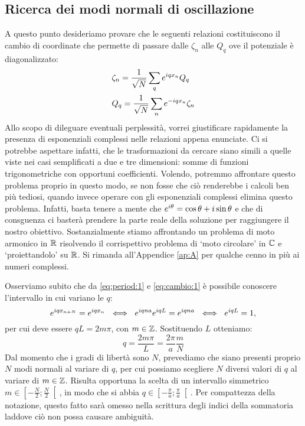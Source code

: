     \subsection{Ricerca dei modi normali di oscillazione}
        A questo punto desideriamo provare che le seguenti relazioni costituiscono il cambio di coordinate che permette di passare dalle $\zeta_n$ alle $Q_q$ ove il potenziale \`e diagonalizzato:
        \begin{align}
            &\zeta_n=\frac{1}{\sqrt{N}}\sum_q e^{iqx_n}Q_q \label{eq:cambio:1}\\
            &Q_q=\frac{1}{\sqrt{N}}\sum_n e^{-iqx_n}\zeta_n \label{eq:cambio:2}
        \end{align}
        Allo scopo di dileguare eventuali perplessit\`a, vorrei giustificare rapidamente la presenza di esponenziali complessi nelle relazioni appena enunciate. Ci si potrebbe aspettare infatti, che le trasformazioni da cercare siano simili a quelle viste nei casi semplificati a due e tre dimensioni: somme di funzioni trigonometriche con opportuni coefficienti. Volendo, potremmo affrontare questo problema proprio in questo modo, se non fosse che ci\`o renderebbe i calcoli ben pi\`u tediosi, quando invece operare con gli esponenziali complessi elimina questo problema. Infatti, basta tenere a mente che $e^{i\theta}=\cos\theta+i\sin\theta$ e che di consguenza ci baster\`a prendere la parte reale della soluzione per raggiungere il nostro obiettivo. Sostanzialmente stiamo affrontando un problema di moto armonico in $\mathbb{R}$ risolvendo il corrispettivo problema di `moto circolare' in $\mathbb{C}$ e `proiettandolo' su $\mathbb{R}$. Si rimanda all'Appendice \ref{ap:A} per qualche cenno in pi\`u ai numeri complessi.
        \par Osserviamo subito che da \eqref{eq:period:1} e \eqref{eq:cambio:1} \`e possibile conoscere l'intervallo in cui variano le $q$:
            $$\myexp{iqx_{n+N}}=\myexp{iqx_n}\ \iff\ \myexp{iqna}\myexp{iqL}=\myexp{iqna}\ \iff\ \myexp{iqL}=1,$$
        per cui deve essere $qL=2m\pi$, con $m\in\mathbb{Z}$. Sostituendo $L$ otteniamo:
        \begin{equation}
            q=\frac{2m\pi}{L}=\frac{2\pi}{a}\frac{m}{N}
            \label{eq:q}
        \end{equation}
        Dal momento che i gradi di libert\`a sono $N$, prevediamo che siano presenti proprio $N$ modi normali al variare di $q$, per cui possiamo scegliere $N$ diversi valori di $q$ al variare di $m\in\mathbb{Z}$. Risulta opportuna la scelta di un intervallo simmetrico $\displaystyle m\in\left[-\frac{N}{2};\frac{N}{2}\right[$, in modo che si abbia $\displaystyle q\in\left[-\frac{\pi}{a};\frac{\pi}{a}\right[$. Per compattezza della notazione, questo fatto sar\`a omesso nella scrittura degli indici della sommatoria laddove ci\`o non possa causare ambiguit\`a. 
